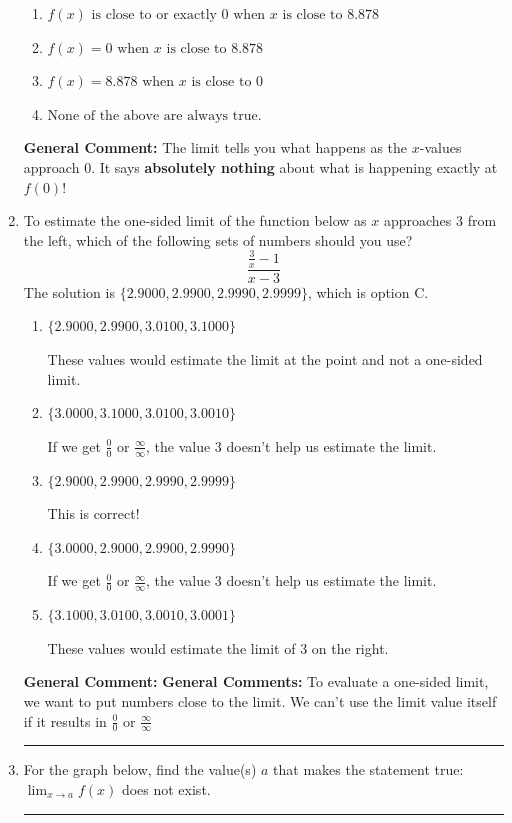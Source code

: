 \documentclass{extbook}[14pt]
\newcommand{\litem}[1]{\item #1

\rule{\textwidth}{0.4pt}}
\begin{document}
\begin{enumerate}
{\begin{enumerate}[label=\Alph*.]
\item \( f(x) \text{ is close to or exactly } 0 \text{ when } x \text{ is close to } 8.878 \)


\item \( f(x) = 0 \text{ when } x \text{ is close to } 8.878 \)


\item \( f(x) = 8.878 \text{ when } x \text{ is close to } 0 \)


\item \( \text{None of the above are always true.} \)


\end{enumerate}

\textbf{General Comment:} The limit tells you what happens as the $x$-values approach $0$. It says \textbf{absolutely nothing} about what is happening exactly at $f(0)$!
}
\litem{
To estimate the one-sided limit of the function below as $x$ approaches 3 from the left, which of the following sets of numbers should you use?
\[ \frac{\frac{3}{x} - 1}{x - 3} \]The solution is \( \{ 2.9000, 2.9900, 2.9990, 2.9999 \} \), which is option C.\begin{enumerate}[label=\Alph*.]
\item \( \{ 2.9000, 2.9900, 3.0100, 3.1000 \} \)

These values would estimate the limit at the point and not a one-sided limit.
\item \( \{ 3.0000, 3.1000, 3.0100, 3.0010 \} \)

If we get $\frac{0}{0}$ or $\frac{\infty}{\infty}$, the value 3 doesn't help us estimate the limit.
\item \( \{ 2.9000, 2.9900, 2.9990, 2.9999 \} \)

This is correct!
\item \( \{ 3.0000, 2.9000, 2.9900, 2.9990 \} \)

If we get $\frac{0}{0}$ or $\frac{\infty}{\infty}$, the value 3 doesn't help us estimate the limit.
\item \( \{ 3.1000, 3.0100, 3.0010, 3.0001 \} \)

These values would estimate the limit of 3 on the right.
\end{enumerate}

\textbf{General Comment:} \textbf{General Comments:} To evaluate a one-sided limit, we want to put numbers close to the limit. We can't use the limit value itself if it results in $\frac{0}{0}$ or $\frac{\infty}{\infty}$
}
\litem{
For the graph below, find the value(s) $a$ that makes the statement true: $ \displaystyle \lim_{x \rightarrow a} f(x)$ does not exist.

}
\end{enumerate}
\end{document}
